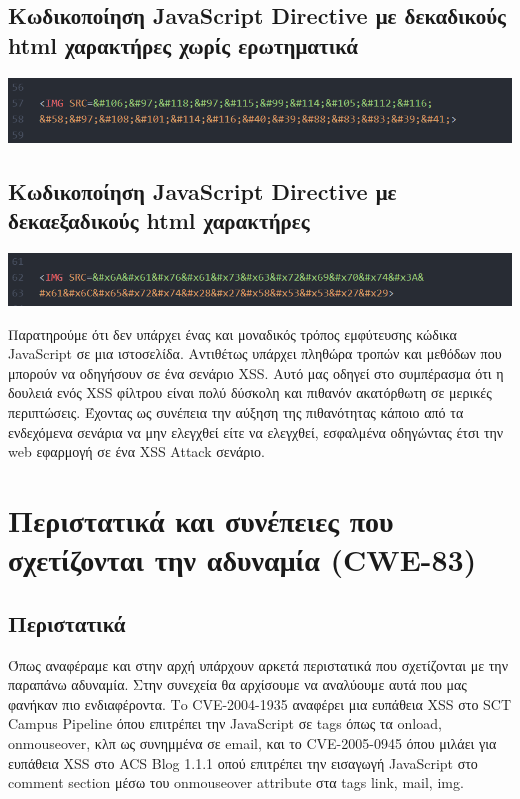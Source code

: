 \subsection{Κωδικοποίηση JavaScript Directive με δεκαδικούς html χαρακτήρες χωρίς ερωτηματικά }
\begin{center}
			\includegraphics[width=1\textwidth]{image/21.PNG}		
\end{center}
\subsection{Κωδικοποίηση JavaScript Directive με δεκαεξαδικούς html χαρακτήρες}
\begin{center}
			\includegraphics[width=1\textwidth]{image/22.PNG}		
\end{center}
\noindent
Παρατηρούμε ότι δεν υπάρχει ένας και μοναδικός τρόπος εμφύτευσης κώδικα JavaScript  σε μια ιστοσελίδα. Αντιθέτως υπάρχει πληθώρα τροπών και μεθόδων που μπορούν να οδηγήσουν σε ένα σενάριο XSS. Αυτό μας οδηγεί στο συμπέρασμα ότι η δουλειά ενός XSS φίλτρου είναι πολύ δύσκολη και πιθανόν ακατόρθωτη σε μερικές περιπτώσεις. Έχοντας ως συνέπεια την αύξηση της πιθανότητας κάποιο από τα ενδεχόμενα σενάρια να μην ελεγχθεί είτε να ελεγχθεί, εσφαλμένα οδηγώντας έτσι την web εφαρμογή σε ένα XSS Attack σενάριο.

\section{Περιστατικά και συνέπειες που σχετίζονται την αδυναμία (CWE-83)}


\subsection{Περιστατικά}
\noindent
Όπως αναφέραμε και στην αρχή υπάρχουν αρκετά περιστατικά που σχετίζονται με την παραπάνω αδυναμία. Στην συνεχεία θα αρχίσουμε να αναλύουμε αυτά που μας φανήκαν πιο ενδιαφέροντα. Τo CVE-2004-1935 αναφέρει μια ευπάθεια XSS στο SCT Campus Pipeline όπου επιτρέπει την JavaScript  σε tags όπως τα onload, onmouseover, κλπ ως συνημμένα σε email, και το CVE-2005-0945 όπου μιλάει για ευπάθεια XSS στο ACS Blog 1.1.1 οπού επιτρέπει την εισαγωγή JavaScript στο comment section μέσω του onmouseover attribute στα tags link, mail, img.  

